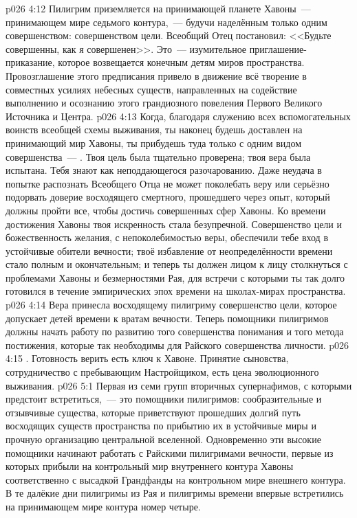 \vs p026 4:12 Пилигрим приземляется на принимающей планете Хавоны~--- принимающем мире седьмого контура,~--- будучи наделённым только одним совершенством: совершенством цели. Всеобщий Отец постановил: <<Будьте совершенны, как я совершенен>>. Это~--- изумительное приглашение\hyp{}приказание, которое возвещается конечным детям миров пространства. Провозглашение этого предписания привело в движение всё творение в совместных усилиях небесных существ, направленных на содействие выполнению и осознанию этого грандиозного повеления Первого Великого Источника и Центра.
\vs p026 4:13 Когда, благодаря служению всех вспомогательных воинств всеобщей схемы выживания, ты наконец будешь доставлен на принимающий мир Хавоны, ты прибудешь туда только с одним видом совершенства~--- . Твоя цель была тщательно проверена; твоя вера была испытана. Тебя знают как неподдающегося разочарованию. Даже неудача в попытке распознать Всеобщего Отца не может поколебать веру или серьёзно подорвать доверие восходящего смертного, прошедшего через опыт, который должны пройти все, чтобы достичь совершенных сфер Хавоны. Ко времени достижения Хавоны твоя искренность стала безупречной. Совершенство цели и божественность желания, с непоколебимостью веры, обеспечили тебе вход в устойчивые обители вечности; твоё избавление от неопределённости времени стало полным и окончательным; и теперь ты должен лицом к лицу столкнуться с проблемами Хавоны и безмерностями Рая, для встречи с которыми ты так долго готовился в течение эмпирических эпох времени на школах\hyp{}мирах пространства.
\vs p026 4:14 Вера принесла восходящему пилигриму совершенство цели, которое допускает детей времени к вратам вечности. Теперь помощники пилигримов должны начать работу по развитию того совершенства понимания и того метода постижения, которые так необходимы для Райского совершенства личности.
\vs p026 4:15 . Готовность верить есть ключ к Хавоне. Принятие сыновства, сотрудничество с пребывающим Настройщиком, есть цена эволюционного выживания.
\vs p026 5:1 Первая из семи групп вторичных супернафимов, с которыми предстоит встретиться,~--- это помощники пилигримов: сообразительные и отзывчивые существа, которые приветствуют прошедших долгий путь восходящих существ пространства по прибытию их в устойчивые миры и прочную организацию центральной вселенной. Одновременно эти высокие помощники начинают работать с Райскими пилигримами вечности, первые из которых прибыли на контрольный мир внутреннего контура Хавоны соответственно с высадкой Грандфанды на контрольном мире внешнего контура. В те далёкие дни пилигримы из Рая и пилигримы времени впервые встретились на принимающем мире контура номер четыре.
